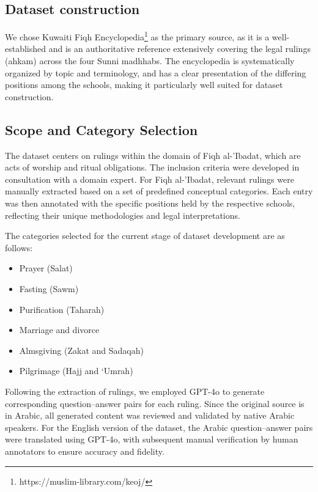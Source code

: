 \documentclass[letterpaper]{article}
\begin{document}
\subsection{Dataset construction} We chose Kuwaiti Fiqh Encyclopedia\footnote{https://muslim-library.com/keoj/} as the primary source, as it is a well-established and is an authoritative reference extensively covering the legal rulings (ahkam) across the four Sunni madhhabs. The encyclopedia is systematically organized by topic and terminology, and has a clear presentation of the differing positions among the schools, making it particularly well suited for dataset construction.

\subsection{Scope and Category Selection}
The dataset centers on rulings within the domain of Fiqh al-'Ibadat, which are acts of worship and ritual obligations. The inclusion criteria were developed in consultation with a domain expert. For Fiqh al-'Ibadat, relevant rulings were manually extracted based on a set of predefined conceptual categories. Each entry was then annotated with the specific positions held by the respective schools, reflecting their unique methodologies and legal interpretations.


The categories selected for the current stage of dataset development are as follows:
\begin{itemize}
    \item Prayer (Salat)
    \item Fasting (Sawm)
    \item Purification (Taharah)
    \item Marriage and divorce
    \item Almsgiving (Zakat and Sadaqah)
    \item Pilgrimage (Hajj and ‘Umrah)
\end{itemize}

Following the extraction of rulings, we employed GPT-4o to generate corresponding question–answer pairs for each ruling. Since the original source is in Arabic, all generated content was reviewed and validated by native Arabic speakers. For the English version of the dataset, the Arabic question–answer pairs were translated using GPT-4o, with subsequent manual verification by human annotators to ensure accuracy and fidelity.
\end{document}
